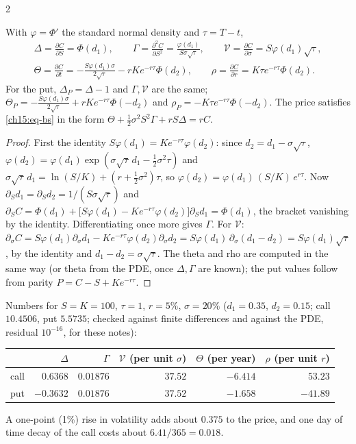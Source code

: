 \begin{paracol}{2}
\begin{proposition}\label{ch15:prop-greeks}
With $\varphi=\Phi'$ the standard normal density and $\tau=T-t$,
\begin{equation}\label{ch15:eq-greeks}
\begin{gathered}
  \Delta=\frac{\partial C}{\partial S}=\Phi(d_1),\qquad
  \Gamma=\frac{\partial^2C}{\partial S^2}=\frac{\varphi(d_1)}{S\sigma\sqrt\tau},\qquad
  \mathcal V=\frac{\partial C}{\partial\sigma}=S\varphi(d_1)\sqrt\tau,\\
  \Theta=\frac{\partial C}{\partial t}=-\frac{S\varphi(d_1)\sigma}{2\sqrt\tau}-rKe^{-r\tau}\Phi(d_2),\qquad
  \rho=\frac{\partial C}{\partial r}=K\tau e^{-r\tau}\Phi(d_2).
\end{gathered}
\end{equation}
For the put, $\Delta_P=\Delta-1$ and $\Gamma,\mathcal V$ are the same; $\Theta_P=-\frac{S\varphi(d_1)\sigma}{2\sqrt\tau}+rKe^{-r\tau}\Phi(-d_2)$ and $\rho_P=-K\tau e^{-r\tau}\Phi(-d_2)$.
The price satisfies \eqref{ch15:eq-bs} in the form $\Theta+\tfrac12\sigma^2S^2\Gamma+rS\Delta=rC$.
\end{proposition}
\begin{proof}
First the identity $S\varphi(d_1)=Ke^{-r\tau}\varphi(d_2)$: since $d_2=d_1-\sigma\sqrt\tau$,
$\varphi(d_2)=\varphi(d_1)\exp(\sigma\sqrt\tau\,d_1-\tfrac12\sigma^2\tau)$ and $\sigma\sqrt\tau\,d_1=\ln(S/K)+(r+\tfrac12\sigma^2)\tau$, so $\varphi(d_2)=\varphi(d_1)\,(S/K)\,e^{r\tau}$.
Now $\partial_Sd_1=\partial_Sd_2=1/(S\sigma\sqrt\tau)$ and
$\partial_SC=\Phi(d_1)+\bigl[S\varphi(d_1)-Ke^{-r\tau}\varphi(d_2)\bigr]\partial_Sd_1=\Phi(d_1)$, the bracket vanishing by the identity. Differentiating once more gives $\Gamma$.
For $\mathcal V$: $\partial_\sigma C=S\varphi(d_1)\partial_\sigma d_1-Ke^{-r\tau}\varphi(d_2)\partial_\sigma d_2=S\varphi(d_1)\,\partial_\sigma(d_1-d_2)=S\varphi(d_1)\sqrt\tau$, by the identity and $d_1-d_2=\sigma\sqrt\tau$. The theta and rho are computed in the same way (or theta from the PDE, once $\Delta,\Gamma$ are known);
the put values follow from parity $P=C-S+Ke^{-r\tau}$.
\end{proof}

Numbers for $S=K=100$, $\tau=1$, $r=5\%$, $\sigma=20\%$ ($d_1=0.35$, $d_2=0.15$; call $10.4506$, put $5.5735$; checked against finite differences and against the PDE, residual $10^{-16}$, for these notes):
\begin{center}\small
\begin{tabular}{l r r r r r}
\toprule
 & $\Delta$ & $\Gamma$ & $\mathcal V$ (per unit $\sigma$) & $\Theta$ (per year) & $\rho$ (per unit $r$)\\
\midrule
call & $0.6368$ & $0.01876$ & $37.52$ & $-6.414$ & $53.23$\\
put  & $-0.3632$ & $0.01876$ & $37.52$ & $-1.658$ & $-41.89$\\
\bottomrule
\end{tabular}
\end{center}
A one-point (1\%) rise in volatility adds about $0.375$ to the price, and one day of time decay of the call costs about $6.41/365=0.018$.


\end{paracol}
